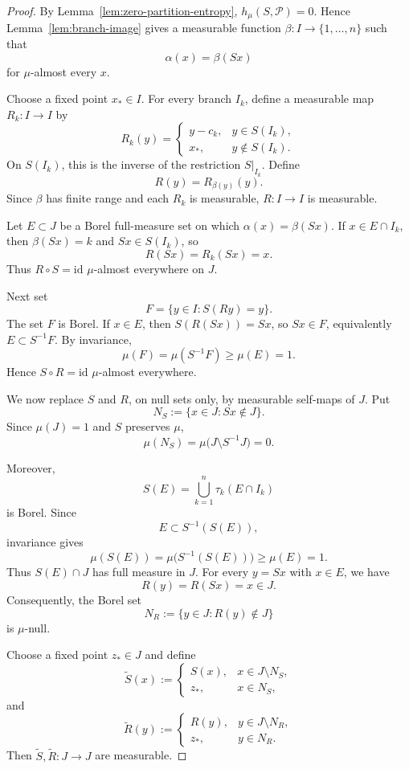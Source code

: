 \documentclass[10pt,a4paper]{amsart}
\newcommand{\cP}{\mathcal P}
\begin{document}
\begin{proof}
By Lemma~\ref{lem:zero-partition-entropy}, \(h_\mu(S,\cP)=0\). Hence
Lemma~\ref{lem:branch-image} gives a measurable function
\(\beta:I\to\{1,\ldots,n\}\) such that
\[
        \alpha(x)=\beta(Sx)
\]
for \(\mu\)-almost every \(x\).

Choose a fixed point \(x_*\in I\). For every branch \(I_k\), define a measurable map
\(R_k:I\to I\) by
\[
R_k(y)=
\begin{cases}
        y-c_k, & y\in S(I_k),\\
        x_*,   & y\notin S(I_k).
\end{cases}
\]
On \(S(I_k)\), this is the inverse of the restriction \(S|_{I_k}\). Define
\[
        R(y)=R_{\beta(y)}(y).
\]
Since \(\beta\) has finite range and each \(R_k\) is measurable, \(R:I\to I\) is
measurable.

Let \(E\subset J\) be a Borel full-measure set on which
\(\alpha(x)=\beta(Sx)\). If \(x\in E\cap I_k\), then \(\beta(Sx)=k\) and
\(Sx\in S(I_k)\), so
\[
        R(Sx)=R_k(Sx)=x.
\]
Thus \(R\circ S=\mathrm{id}\) \(\mu\)-almost everywhere on \(J\).

Next set
\[
        F=\{y\in I:S(Ry)=y\}.
\]
The set \(F\) is Borel. If \(x\in E\), then
\(S(R(Sx))=Sx\), so \(Sx\in F\), equivalently \(E\subset S^{-1}F\). By
invariance,
\[
        \mu(F)=\mu(S^{-1}F)\geq\mu(E)=1.
\]
Hence \(S\circ R=\mathrm{id}\) \(\mu\)-almost everywhere.

We now replace \(S\) and \(R\), on null sets only, by measurable
self-maps of \(J\). Put
\[
        N_S
        :=
        \{x\in J:Sx\notin J\}.
\]
Since \(\mu(J)=1\) and \(S\) preserves \(\mu\),
\[
        \mu(N_S)
        =
        \mu\bigl(J\setminus S^{-1}J\bigr)
        =
        0.
\]

Moreover,
\[
        S(E)
        =
        \bigcup_{k=1}^{n}\tau_k(E\cap I_k)
\]
is Borel. Since
\[
        E\subset S^{-1}(S(E)),
\]
invariance gives
\[
        \mu(S(E))
        =
        \mu\bigl(S^{-1}(S(E))\bigr)
        \geq
        \mu(E)
        =
        1.
\]
Thus \(S(E)\cap J\) has full measure in \(J\). For every
\(y=Sx\) with \(x\in E\), we have
\[
        R(y)=R(Sx)=x\in J.
\]
Consequently, the Borel set
\[
        N_R
        :=
        \{y\in J:R(y)\notin J\}
\]
is \(\mu\)-null.

Choose a fixed point \(z_*\in J\) and define
\[
        \widetilde S(x)
        :=
        \begin{cases}
        S(x),&x\in J\setminus N_S,\\
        z_*,&x\in N_S,
        \end{cases}
\]
and
\[
        \widetilde R(y)
        :=
        \begin{cases}
        R(y),&y\in J\setminus N_R,\\
        z_*,&y\in N_R.
        \end{cases}
\]
Then \(\widetilde S,\widetilde R:J\to J\) are measurable.


\end{proof}
\end{document}
